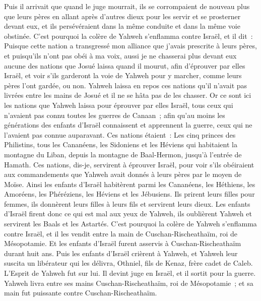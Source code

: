 \begin{multicols}{2}
Puis il arrivait que quand le juge mourrait, ils se corrompaient de nouveau plus que leurs pères en allant après d'autres dieux pour les servir et se prosterner devant eux, et ils persévéraient dans la même conduite et dans la même voie obstinée.
C'est pourquoi la colère de Yahweh s'enflamma contre Israël, et il dit~: Puisque cette nation a transgressé mon alliance que j'avais prescrite à leurs pères, et puisqu'ils n'ont pas obéi à ma voix,
aussi je ne chasserai plus devant eux aucune des nations que Josué laissa quand il mourut,
afin d'éprouver par elles Israël, et voir s'ils garderont la voie de Yahweh pour y marcher, comme leurs pères l'ont gardée, ou non.
Yahweh laissa en repos ces nations qu'il n'avait pas livrées entre les mains de Josué et il ne se hâta pas de les chasser.
\VerseOne{}Or ce sont ici les nations que Yahweh laissa pour éprouver par elles Israël, tous ceux qui n'avaient pas connu toutes les guerres de Canaan~; 
afin qu'au moins les générations des enfants d'Israël connaissent et apprennent la guerre, ceux qui ne l'avaient pas connue auparavant.
Ces nations étaient~: Les cinq princes des Philistins, tous les Cananéens, les Sidoniens et les Héviens qui habitaient la montagne du Liban, depuis la montagne de Baal-Hermon, jusqu'à l'entrée de Hamath.
Ces nations, dis-je, servirent à éprouver Israël, pour voir s'ils obéiraient aux commandements que Yahweh avait donnés à leurs pères par le moyen de Moïse.
Ainsi les enfants d'Israël habitèrent parmi les Cananéens, les Héthiens, les Amoréens, les Phéréziens, les Héviens et les Jébusiens.
Ils prirent leurs filles pour femmes, ils donnèrent leurs filles à leurs fils et servirent leurs dieux.
Les enfants d'Israël firent donc ce qui est mal aux yeux de Yahweh, ils oublièrent Yahweh et servirent les Baals et les Astartés.
C'est pourquoi la colère de Yahweh s'enflamma contre Israël, et il les vendit entre la main de Cuschan-Rischeathaïm, roi de Mésopotamie. Et les enfants d'Israël furent asservis à Cuschan-Rischeathaïm durant huit ans.
Puis les enfants d'Israël crièrent à Yahweh, et Yahweh leur suscita un libérateur qui les délivra, Othniel, fils de Kenaz, frère cadet de Caleb.
L'Esprit de Yahweh fut sur lui. Il devint juge en Israël, et il sortit pour la guerre. Yahweh livra entre ses mains Cuschan-Rischeathaïm, roi de Mésopotamie~; et sa main fut puissante contre Cuschan-Rischeathaïm.

\end{multicols}
